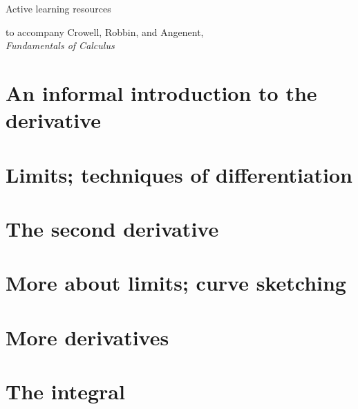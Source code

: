 \documentclass{beamer}
\begin{document}
\newcommand{\der}{\operatorname{d\!}{}}

\newcommand{\mygamma}{\textup{\textgamma}}



\begin{frame}{Active learning resources}

to accompany Crowell, Robbin, and Angenent,\\
 \emph{Fundamentals of Calculus}

\end{frame}

\tableofcontents

\section{An informal introduction to the derivative}




\section{Limits; techniques of differentiation}




\section{The second derivative}


\section{More about limits; curve sketching}



\section{More derivatives}


\section{The integral}

\end{document}
